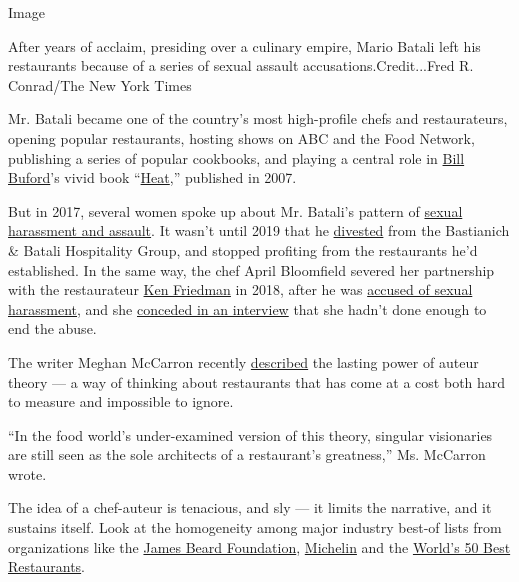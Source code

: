 Image

After years of acclaim, presiding over a culinary empire, Mario Batali
left his restaurants because of a series of sexual assault
accusations.Credit...Fred R. Conrad/The New York Times

Mr. Batali became one of the country's most high-profile chefs and
restaurateurs, opening popular restaurants, hosting shows on ABC and the
Food Network, publishing a series of popular cookbooks, and playing a
central role in
\href{https://www.nytimes3xbfgragh.onion/2020/07/21/dining/bill-buford-dirt-book-chicken-recipe.html}{Bill
Buford}'s vivid book
``\href{https://www.penguinrandomhouse.com/books/20949/heat-by-bill-buford/}{Heat},''
published in 2007.

But in 2017, several women spoke up about Mr. Batali's pattern of
\href{https://www.nytimes3xbfgragh.onion/2017/12/11/dining/mario-batali-sexual-misconduct.html}{sexual
harassment and assault}. It wasn't until 2019 that he
\href{https://www.nytimes3xbfgragh.onion/2019/03/06/dining/mario-batali-bastianich-restaurants.html}{divested}
from the Bastianich \& Batali Hospitality Group, and stopped profiting
from the restaurants he'd established. In the same way, the chef April
Bloomfield severed her partnership with the restaurateur
\href{https://www.nytimes3xbfgragh.onion/2017/12/12/dining/ken-friedman-sexual-harassment.html}{Ken
Friedman} in 2018, after he was
\href{https://www.nytimes3xbfgragh.onion/2017/12/12/dining/ken-friedman-sexual-harassment.html}{accused
of sexual harassment}, and she
\href{https://www.nytimes3xbfgragh.onion/2018/10/16/dining/april-bloomfield-spotted-pig-ken-friedman.html}{conceded
in an interview} that she hadn't done enough to end the abuse.

The writer Meghan McCarron recently
\href{https://www.eater.com/2019/11/7/20953914/jessica-koslow-gabriela-camara-restaurant-onda-opening}{described}
the lasting power of auteur theory --- a way of thinking about
restaurants that has come at a cost both hard to measure and impossible
to ignore.

``In the food world's under-examined version of this theory, singular
visionaries are still seen as the sole architects of a restaurant's
greatness,'' Ms. McCarron wrote.

The idea of a chef-auteur is tenacious, and sly --- it limits the
narrative, and it sustains itself. Look at the homogeneity among major
industry best-of lists from organizations like the
\href{https://www.jamesbeard.org/}{James Beard Foundation},
\href{https://guide.michelin.com/en/article/news-and-views/michelin-nordic-guide-2020-stars-and-awards-announced}{Michelin}
and the \href{https://www.theworlds50best.com/}{World's 50 Best
Restaurants}.

